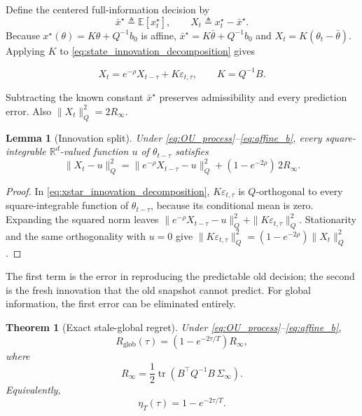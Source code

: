 \documentclass[11pt]{article}
\newtheorem{lemma}{Lemma}
\newtheorem{theorem}{Theorem}
\begin{document}
Define the centered full-information decision by
\begin{equation}
    \bar x^\star\triangleq\mathbb E[x_t^\star],
    \qquad X_t\triangleq x_t^\star-\bar x^\star.
    \label{eq:centered_clairvoyant_action}
\end{equation}
Because $x^\star(\theta)=K\theta+Q^{-1}b_0$ is affine, $\bar x^\star=K\bar\theta+Q^{-1}b_0$ and $X_t=K(\theta_t-\bar\theta)$. Applying $K$ to \eqref{eq:state_innovation_decomposition} gives

\begin{equation}
X_t=e^{-\rho}X_{t-\tau}+K\varepsilon_{t,\tau},\qquad K=Q^{-1}B.
\label{eq:xstar_innovation_decomposition}
\end{equation}

Subtracting the known constant $\bar x^\star$ preserves admissibility and every
prediction error. Also $\|X_t\|_Q^2=2R_\infty$.

\begin{lemma}[Innovation split]
\label{lem:innovation_split}
Under \eqref{eq:OU_process}--\eqref{eq:affine_b}, every square-integrable
$\mathbb R^d$-valued function $u$ of $\theta_{t-\tau}$ satisfies
\begin{equation}
    \|X_t-u\|_Q^2
    =\|e^{-\rho}X_{t-\tau}-u\|_Q^2
      +(1-e^{-2\rho})\,2R_\infty.
    \label{eq:innovation_split}
\end{equation}
\end{lemma}
\begin{proof}
In \eqref{eq:xstar_innovation_decomposition}, $K\varepsilon_{t,\tau}$ is
$Q$-orthogonal to every square-integrable function of $\theta_{t-\tau}$,
because its conditional mean is zero. Expanding the squared norm leaves
$\|e^{-\rho}X_{t-\tau}-u\|_Q^2+\|K\varepsilon_{t,\tau}\|_Q^2$.
Stationarity and the same orthogonality with $u=0$ give
$\|K\varepsilon_{t,\tau}\|_Q^2=(1-e^{-2\rho})\|X_t\|_Q^2$.
\end{proof}

The first term is the error in reproducing the predictable old decision;
the second is the fresh innovation that the old snapshot cannot predict.
For global information, the first error can be eliminated entirely.

\begin{theorem}[Exact stale-global regret]
\label{thm:OU_stale_regret}
Under \eqref{eq:OU_process}--\eqref{eq:affine_b},
\begin{equation}
    \boxed{
    R_{\mathrm{glob}}(\tau)
    =
    \left(
        1-e^{-2\tau/T}
    \right)R_\infty,
    }
    \label{eq:OU_exact_regret}
\end{equation}
where
\begin{equation}
    R_\infty
    =
    \frac{1}{2}
    \operatorname{tr}
    \left(
        B^\top Q^{-1}B\,
        \Sigma_\infty
    \right).
    \label{eq:OU_Rinf}
\end{equation}
Equivalently,
\begin{equation}
    \boxed{
    \eta_T(\tau)
    =
    1-e^{-2\tau/T}.
    }
    \label{eq:OU_etaT}
\end{equation}
\end{theorem}
\end{document}
